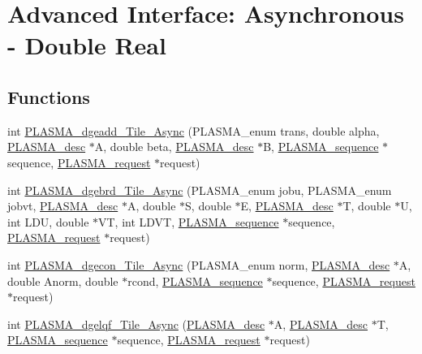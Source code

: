 \hypertarget{group__double__Tile__Async}{}\section{Advanced Interface\+: Asynchronous -\/ Double Real}
\label{group__double__Tile__Async}
\subsection*{Functions}
\begin{DoxyCompactItemize}
\item 
int \hyperlink{group__double__Tile__Async_ga0d68ce7e82adc06e2062cbd359d305b9_ga0d68ce7e82adc06e2062cbd359d305b9}{P\+L\+A\+S\+M\+A\+\_\+dgeadd\+\_\+\+Tile\+\_\+\+Async} (P\+L\+A\+S\+M\+A\+\_\+enum trans, double alpha, \hyperlink{structplasma__desc__t}{P\+L\+A\+S\+M\+A\+\_\+desc} $\ast$A, double beta, \hyperlink{structplasma__desc__t}{P\+L\+A\+S\+M\+A\+\_\+desc} $\ast$B, \hyperlink{structplasma__sequence__t}{P\+L\+A\+S\+M\+A\+\_\+sequence} $\ast$sequence, \hyperlink{structplasma__request__t}{P\+L\+A\+S\+M\+A\+\_\+request} $\ast$request)
\item 
int \hyperlink{group__double__Tile__Async_ga57640ac59ae6cdf692b0041118a1d0d6_ga57640ac59ae6cdf692b0041118a1d0d6}{P\+L\+A\+S\+M\+A\+\_\+dgebrd\+\_\+\+Tile\+\_\+\+Async} (P\+L\+A\+S\+M\+A\+\_\+enum jobu, P\+L\+A\+S\+M\+A\+\_\+enum jobvt, \hyperlink{structplasma__desc__t}{P\+L\+A\+S\+M\+A\+\_\+desc} $\ast$A, double $\ast$S, double $\ast$E, \hyperlink{structplasma__desc__t}{P\+L\+A\+S\+M\+A\+\_\+desc} $\ast$T, double $\ast$U, int L\+D\+U, double $\ast$V\+T, int L\+D\+V\+T, \hyperlink{structplasma__sequence__t}{P\+L\+A\+S\+M\+A\+\_\+sequence} $\ast$sequence, \hyperlink{structplasma__request__t}{P\+L\+A\+S\+M\+A\+\_\+request} $\ast$request)
\item 
int \hyperlink{group__double__Tile__Async_ga5afe2ed15323fa76e221fc5a394a27d9_ga5afe2ed15323fa76e221fc5a394a27d9}{P\+L\+A\+S\+M\+A\+\_\+dgecon\+\_\+\+Tile\+\_\+\+Async} (P\+L\+A\+S\+M\+A\+\_\+enum norm, \hyperlink{structplasma__desc__t}{P\+L\+A\+S\+M\+A\+\_\+desc} $\ast$A, double Anorm, double $\ast$rcond, \hyperlink{structplasma__sequence__t}{P\+L\+A\+S\+M\+A\+\_\+sequence} $\ast$sequence, \hyperlink{structplasma__request__t}{P\+L\+A\+S\+M\+A\+\_\+request} $\ast$request)
\item 
int \hyperlink{group__double__Tile__Async_ga95e175393a88bdc2bb6914e30b03e465_ga95e175393a88bdc2bb6914e30b03e465}{P\+L\+A\+S\+M\+A\+\_\+dgelqf\+\_\+\+Tile\+\_\+\+Async} (\hyperlink{structplasma__desc__t}{P\+L\+A\+S\+M\+A\+\_\+desc} $\ast$A, \hyperlink{structplasma__desc__t}{P\+L\+A\+S\+M\+A\+\_\+desc} $\ast$T, \hyperlink{structplasma__sequence__t}{P\+L\+A\+S\+M\+A\+\_\+sequence} $\ast$sequence, \hyperlink{structplasma__request__t}{P\+L\+A\+S\+M\+A\+\_\+request} $\ast$request)

\end{DoxyCompactItemize}
